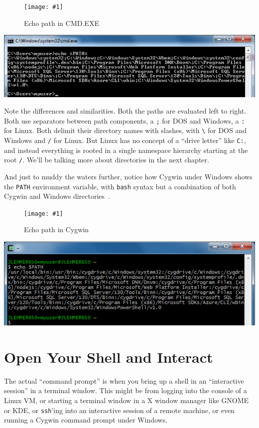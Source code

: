\documentclass[10pt,]{book}
\numberwithin{figure}{chapter}
\DeclareRobustCommand{\fimg}[3]{
\ifxetex
\begin{figure}[H]
\texttt{[image: \#1]}
\caption{#2}
\label{fig:#3}
\end{figure}
\fi}
\DeclareRobustCommand{\fref}[1]{\ifxetex{(Figure \ref{fig:#1})}\fi}
\begin{document}
\ifxetex\fimg{./images/echo-path-cmd.png}{Echo path in CMD.EXE}{echo-path-in-cmd}
\else
\includegraphics{./images/echo-path-cmd.png} \fi

Note the differences and similarities. Both the paths are evaluated left
to right. Both use separators between path components, a \texttt{;} for
DOS and Windows, a \texttt{:} for Linux. Both delimit their directory
names with slashes, with \texttt{\textbackslash{}} for DOS and Windows
and \texttt{/} for Linux. But Linux has no concept of a ``drive letter''
like \texttt{C:}, and instead everything is rooted in a single namespace
hierarchy starting at the root \texttt{/}. We'll be talking more about
directories in the next chapter.

And just to muddy the waters further, notice how Cygwin under Windows
shows the \texttt{PATH} environment variable, with \texttt{bash} syntax
but a combination of both Cygwin and Windows
directories~\fref{echo-path-cygwin}.

\ifxetex\fimg{./images/echo-path-cygwin.png}{Echo path in Cygwin}{echo-path-cygwin}
\else
\includegraphics{./images/echo-path-cygwin.png} \fi

\section{Open Your Shell and
Interact}\label{open-your-shell-and-interact}

The actual ``command prompt'' is when you bring up a shell in an
``interactive session'' in a terminal window. This might be from logging
into the console of a Linux VM, or starting a terminal window in a X
window manager like GNOME or KDE, or \texttt{ssh}'ing into an
interactive session of a remote machine, or even running a Cygwin
command prompt under Windows.
\end{document}
